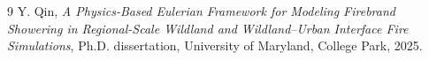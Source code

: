 \begin{thebibliography}{9}
Y. Qin, \emph{A Physics-Based Eulerian Framework for Modeling Firebrand
Showering in Regional-Scale Wildland and Wildland--Urban Interface Fire
Simulations}, Ph.D. dissertation, University of Maryland, College Park, 2025.
\end{thebibliography}
